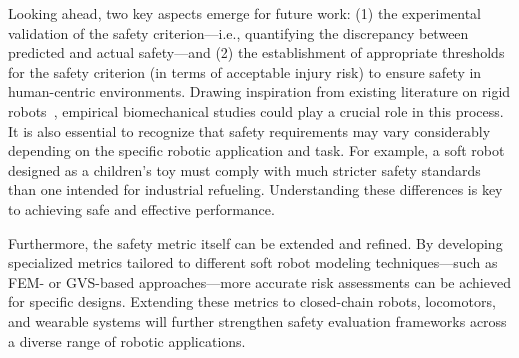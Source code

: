 Looking ahead, two key aspects emerge for future work: (1) the experimental validation of the safety criterion—i.e., quantifying the discrepancy between predicted and actual safety—and (2) the establishment of appropriate thresholds~\citep{Isots_15066_2016, behrens2022statistical} for the safety criterion (in terms of acceptable injury risk) to ensure safety in human-centric environments. Drawing inspiration from existing literature on rigid robots~\citep{yamada1997evaluation, muttray2014collaborative, behrens2022statistical}, empirical biomechanical studies could play a crucial role in this process. It is also essential to recognize that safety requirements may vary considerably depending on the specific robotic application and task. For example, a soft robot designed as a children’s toy must comply with much stricter safety standards than one intended for industrial refueling. Understanding these differences is key to achieving safe and effective performance.

Furthermore, the safety metric itself can be extended and refined. By developing specialized metrics tailored to different soft robot modeling techniques—such as \gls{FEM}- or \gls{GVS}-based approaches—more accurate risk assessments can be achieved for specific designs. Extending these metrics to closed-chain robots, locomotors, and wearable systems will further strengthen safety evaluation frameworks across a diverse range of robotic applications.

